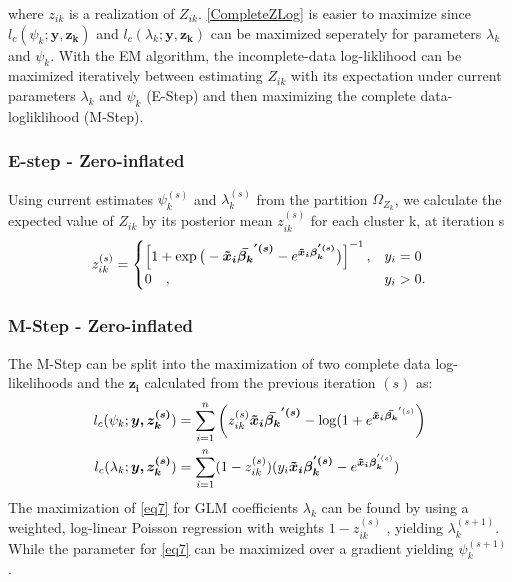 \documentclass[11pt,letterpaper]{article}
\numberwithin{equation}{section}
\numberwithin{equation}{section}
\numberwithin{equation}{section}
\begin{document}
where ${z_{ik}}$ is a realization of $ Z_{ik} $. \eqref{CompleteZLog} is easier to maximize since $l_c(\psi_k;\bm{y,z_{k}})$ and $l_c(\lambda_k; \bm{y,z_k}) $ can be maximized seperately for parameters $\lambda_k$ and $\psi_k$. With the EM algorithm, the incomplete-data log-liklihood can be maximized iteratively between estimating $Z_{ik}$ with its expectation under current parameters $\lambda_k$ and $\psi_k$ (E-Step) and then maximizing the complete data-logliklihood (M-Step). 

\subsubsection{E-step -  Zero-inflated}%

Using current estimates $\psi_k^{(s)}$ and $ \lambda_k^{(s)} $ from the partition $ \Omega_{Z_k}$, we calculate the expected value of ${Z_{ik}}$ by its posterior mean ${z_{ik}^{(s)}}$ for each cluster k, at iteration s
\begin{align*}
z_{ik}^{(s)} = \begin{cases}  \left[ 1 + \exp{\big(-\bm{\bm{\tilde{x}}_i \bar{\beta_k}^{'(s)}} - e^ {\bm{\bm{\tilde{x}}_i \beta_k^{'(s)}}} \big) } \right]^{-1}, &  y_{i} = 0 \\
  0 \quad , & y_{i}> 0 .
\end{cases}
\end{align*}


\subsubsection{M-Step - Zero-inflated}
The M-Step can be split into the maximization of two complete data log-likelihoods and the $\bm{z_i}$ calculated from the previous iteration $(s)$ as: 
\begin{align} 
l_c(\psi_k;\bm{y,z_k^{(s)}}) &=\sum_{i=1}^n \left( z_{ik}^{(s)} \bm{\bm{\tilde{x}}_i \bar{\beta_k }^{'(s)}} - \log(1+ e^{\bm{ \bm{\tilde{x}}_i \bar{\beta_k }}^{'(s)}} \right)  \label{eq6}   \\
 l_c(\lambda_k; \bm{y,z_k^{(s)}}) &= \sum_{i=1}^n (1- z_{ik}^{(s)}) (y_i \bm{ \bm{\tilde{x}}_i \beta_k^{'(s)} } - e^{\bm{\bm{\tilde{x}}_i \beta_k}^{'(s)}})\label{eq7} 
 \end{align}
The maximization of \eqref{eq7} for GLM coefficients $\lambda_k$ can be found by using a weighted, log-linear Poisson regression with weights $1 - z_{ik}^{(s)}$ \citep{McCullaghNelder1989}, yielding $\lambda_k^{(s+1)}$. 
While the parameter for \eqref{eq7} can be maximized over a gradient yielding $\psi_k^{(s+1)}$ \citep{Lambert}.
\end{document}
